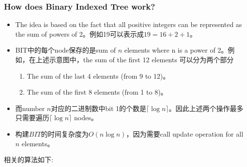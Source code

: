 \subsubsection{How does Binary Indexed Tree work?}
\begin{itemize}
\item The idea is based on the fact that all positive integers can be represented as the sum of powers of 2。例如19可以表示成$19=16+2+1$。
\item BIT中的每个node保存的是sum of $n$ elements where n is a power of 2。例如，在上述示意图中，the sum of the first 12 elements 可以分为两个部分
\begin{enumerate}
\item The sum of the last 4 elements (from 9 to 12)。
\item The sum of the first 8 elements (from 1 to 8)。
\end{enumerate}
\item 而number $ n$对应的二进制数中bit 1的个数是$ \lceil\log n\rceil $。因此上述两个操作最多只需要遍历$ \lceil\log n\rceil $ nodes。
\item 构建$BIT$的时间复杂度为$ O(n\log n) $，因为需要call update operation for all $ n $ elements。
\end{itemize}
相关的算法如下:

